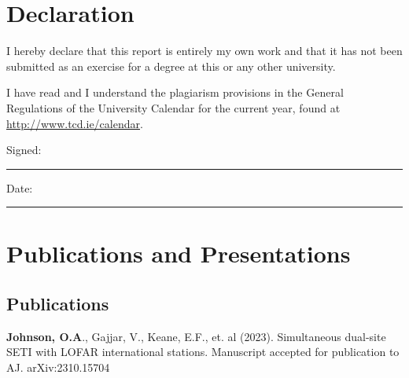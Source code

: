 \documentclass[a4paper,12pt]{article}
\numberwithin{equation}{section}
\begin{document}
\newpage
\setcounter{page}{1}                            %
\footruleheight{1pt}
\headruleheight{1pt}
\rhead{ \thepage}
\cfoot{}
%
{
\hypersetup{linkcolor=black}
\tableofcontents 
} 
\thispagestyle{empty}         
\newpage 

\section*{Declaration}
I hereby declare that this report is entirely my own work and that it has not been submitted as an exercise for a degree at this or any other university.

I have read and I understand the plagiarism provisions in the General Regulations of the University Calendar for the current year, found at \url{http://www.tcd.ie/calendar}.

\vspace{1cm}

Signed:~\rule{5cm}{0.3pt}\hfill Date:~\rule{5cm}{0.3pt}

\vspace*{\fill}
\newpage

\section*{Publications and Presentations}
\subsection*{Publications}

\textbf{Johnson, O.A}., Gajjar, V., Keane, E.F., et. al (2023). Simultaneous dual-site SETI with LOFAR international stations. Manuscript accepted for publication to AJ. arXiv:2310.15704
\end{document}
